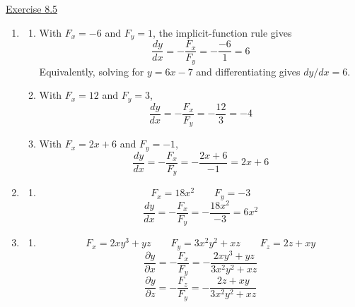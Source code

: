 \underline{Exercise 8.5}
\begin{enumerate}
\item[1.]
\begin{enumerate}
\item[(a)] With $F_{x}=-6$ and $F_{y}=1$, the implicit-function rule gives
\[\frac{dy}{dx}=-\frac{F_{x}}{F_{y}}=-\frac{-6}{1}=6\]
Equivalently, solving for $y=6x-7$ and differentiating gives $dy/dx=6$.
\item[(b)] With $F_{x}=12$ and $F_{y}=3$,
\[\frac{dy}{dx}=-\frac{F_{x}}{F_{y}}=-\frac{12}{3}=-4\]

\item[(c)] With $F_{x}=2x+6$ and $F_{y}=-1$,
\[\frac{dy}{dx}=-\frac{F_{x}}{F_{y}}=-\frac{2x+6}{-1}=2x+6\]

\end{enumerate}

\item[2.]
\begin{enumerate}
\item[(d)] 
\[F_{x}=18x^{2} \qquad F_{y}=-3\]
\[\frac{dy}{dx}=-\frac{F_{x}}{F_{y}}=-\frac{18x^{2}}{-3}=6x^{2}\]

\end{enumerate}

\item[3.]
\begin{enumerate}
\item[(a)] 
\[F_{x}=2xy^{3}+yz \qquad F_{y}=3x^{2}y^{2}+xz \qquad F_{z}=2z+xy\]
\[\frac{\partial y}{\partial x}=-\frac{F_{x}}{F_{y}}=-\frac{2xy^{3}+yz}{3x^{2}y^{2}+xz}\]
\[\frac{\partial y}{\partial z}=-\frac{F_{z}}{F_{y}}=-\frac{2z+xy}{3x^{2}y^{2}+xz}\]

\end{enumerate}

\end{enumerate}
